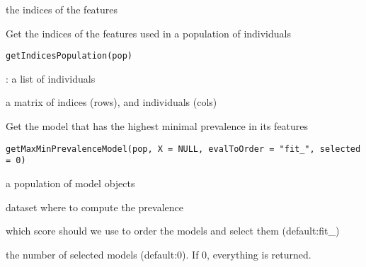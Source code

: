 \documentclass[a4paper]{book}
\begin{document}
%
\begin{Value}
the indices of the features
\end{Value}
%
\begin{Description}
Get the indices of the features used in a population of individuals
\end{Description}
%
\begin{Usage}
\begin{verbatim}
getIndicesPopulation(pop)
\end{verbatim}
\end{Usage}
%
\begin{Arguments}
\begin{ldescription}
\item[\code{pop}] : a list of individuals
\end{ldescription}
\end{Arguments}
%
\begin{Value}
a matrix of indices (rows), and individuals (cols)
\end{Value}
%
\begin{Description}
Get the model that has the highest minimal prevalence in its features
\end{Description}
%
\begin{Usage}
\begin{verbatim}
getMaxMinPrevalenceModel(pop, X = NULL, evalToOrder = "fit_", selected = 0)
\end{verbatim}
\end{Usage}
%
\begin{Arguments}
\begin{ldescription}
\item[\code{pop:}] a population of model objects

\item[\code{X:}] dataset where to compute the prevalence

\item[\code{evalToOrder:}] which score should we use to order the models and select them (default:fit\_)

\item[\code{selected:}] the number of selected models (default:0). If 0, everything is returned.
\end{ldescription}
\end{Arguments}
\end{document}
